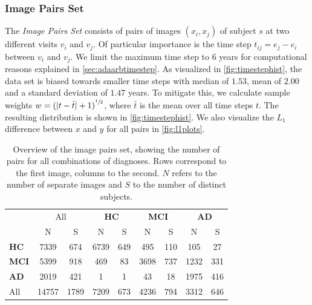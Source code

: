 \subsubsection*{Image Pairs Set}
\label{sec:datpairs}
The \textit{Image Pairs Set} consists of pairs of images $(x_i, x_j)$ of subject $s$ at two different visits $v_i$ and $v_j$. Of particular importance is the time step $t_{ij} = e_j - e_i$ between $v_i$ and $v_j$. We limit the maximum time step to 6 years for computational reasons explained in \autoref{sec:adaarbtimestep}. As visualized in \autoref{fig:timestephist}, the data set is biased towards smaller time steps with median of $1.53$, mean of $2.00$ and a standard deviation of $1.47$ years. To mitigate this, we calculate sample weights $w = {(| t - \bar t | + 1)}^{\sfrac{1}{2}}$, where $\bar t$ is the mean over all time steps $t$. The resulting distribution is shown in \autoref{fig:timestephist}. We also visualize the $L_1$ difference between $x$ and $y$ for all pairs in \autoref{fig:l1plots}.

\begin{table}[h]
	\begin{center}
		\begin{tabular}{l c c | c c c c c c}
			\toprule
			& 
			\multicolumn{2}{c}{All} &
			\multicolumn{2}{c}{\bfseries HC} & 
			\multicolumn{2}{c}{\bfseries MCI} & 
			\multicolumn{2}{c}{\bfseries AD} \\
			\cmidrule(lr){2-3}
			\cmidrule(lr){4-5}
			\cmidrule(lr){6-7}
			\cmidrule(lr){8-9}
			& N & \multicolumn{1}{c}{S} & N & S & N & S & N & S \\ 
			\cmidrule(lr){1-9}
			\bfseries HC  &  7339 &  674 & 6739 & 649 &  495 & 110 &  105 &  27 \\
			\bfseries MCI &  5399 &  918 &  469 &  83 & 3698 & 737 & 1232 & 331 \\
			\bfseries AD  &  2019 &  421 &    1 &   1 &   43 &  18 & 1975 & 416 \\
			\cmidrule(lr){1-9}
			All           & 14757 & 1789 & 7209 & 673 & 4236 & 794 & 3312 & 646 \\
			\bottomrule
		\end{tabular}
		\caption{Overview of the image pairs set, showing the number of pairs for all combinations of diagnoses. Rows correspond to the first image, columns to the second. $N$ refers to the number of separate images and $S$ to the number of distinct subjects.}
		\label{tab:pairsset}
	\end{center}
\end{table}

